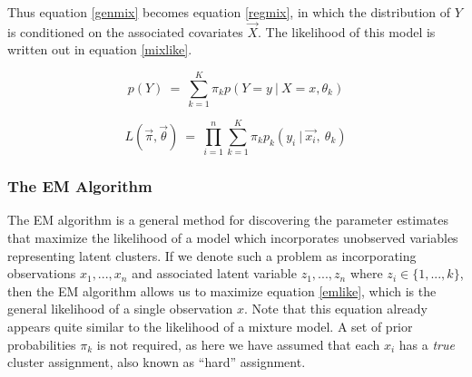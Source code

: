 \documentclass[10pt]{olplainarticle}\usepackage[]{graphicx}\usepackage[]{color}
\begin{document}
% 
% 
% 
% 

Thus equation \ref{genmix} becomes equation \ref{regmix}, in which the distribution of $Y$ is conditioned on the associated covariates $\vec{X}$. The likelihood of this model is written out in equation \ref{mixlike}.

\begin{equation} \label{regmix}
  p(Y) \ =\ \sum_{k=1}^{K}\pi_k p(Y = y\ |\ X = x, \theta_k)
\end{equation}

\begin{equation} \label{mixlike}
   L(\vec{\pi}, \vec{\theta}) \ =\ \prod_{i=1}^n \sum_{k=1}^{K} \pi_k p_k(y_i\ |\ \vec{x_i},\ \theta_k)
\end{equation}


\subsubsection{The EM Algorithm}

The EM algorithm is a general method for discovering the parameter estimates that maximize the likelihood of a model which incorporates unobserved variables representing latent clusters. If we denote such a problem as incorporating observations $x_1, ..., x_n$ and associated latent variable $z_1, ..., z_n$ where $z_i \in \{1,...,k\}$, then the EM algorithm allows us to maximize equation \ref{emlike}, which is the general likelihood of a single observation $x$. Note that this equation already appears quite similar to the likelihood of a mixture model. A set of prior probabilities $\pi_k$ is not required, as here we have assumed that each $x_i$ has a \emph{true} cluster assignment, also known as ``hard'' assignment.
\end{document}
